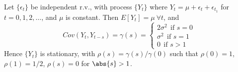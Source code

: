 \begin{example}  Let $\{\epsilon_t\}$ be independent r.v., with process $\{Y_t\}$ where $Y_t = \mu + \epsilon_t + \epsilon_{t_1}$ for $t = 0, 1, 2, \ldots$, and $\mu$ is constant. Then $E[Y_t] = \mu \ \forall t$, and
\begin{equation*}
Cov(Y_t, Y_{t-s}) = \gamma(s) =
\begin{cases}
2 \sigma^2 \ \ \text{if } s = 0 \\
\sigma^2 \ \ \text{if } s = 1 \\
0 \ \ \text{if } s > 1
\end{cases} \nonumber
\end{equation*}
Hence $\{Y_t\}$ is stationary, with $\rho(s) = \gamma(s) / \gamma(0)$ such that $\rho(0) = 1$, $\rho(1) = 1/2$, $\rho(s) = 0$ for $\abs{s} > 1$.
\end{example}
